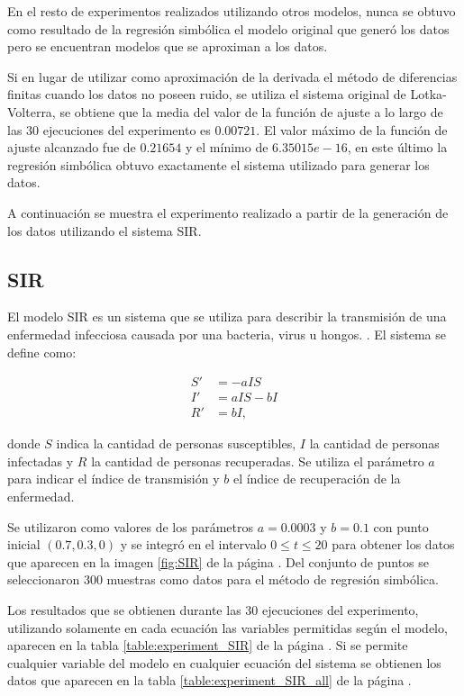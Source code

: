 En el resto de experimentos realizados utilizando otros modelos, nunca se obtuvo como resultado de la regresión simbólica el modelo original que generó los datos pero se encuentran modelos que se aproximan a los datos.

Si en lugar de utilizar como aproximación de la derivada el método de diferencias finitas cuando los datos no poseen ruido, se utiliza el sistema original de Lotka-Volterra, se obtiene que la media del valor de la función de ajuste a lo largo de las 30 ejecuciones del experimento es $0.00721$. El valor máximo de la función de ajuste alcanzado fue de $0.21654$ y el mínimo de $6.35015e-16$, en este último la regresión simbólica obtuvo exactamente el sistema utilizado para generar los datos.


A continuación se muestra el experimento realizado a partir de la generación de los datos utilizando el sistema SIR.

\subsection{SIR}

El modelo SIR es un sistema que se utiliza para describir la transmisión de una enfermedad infecciosa causada por una bacteria, virus u hongos. \cite{weiss2013sir}. El sistema se define como:

\begin{align*}
    S' & = - aIS    \\
    I' & = aIS - bI \\
    R' & = bI,
\end{align*}

donde $S$ indica la cantidad de personas susceptibles, $I$ la cantidad de personas infectadas y $R$ la cantidad de personas recuperadas. Se utiliza el parámetro $a$ para indicar el índice de transmisión y $b$ el índice de recuperación de la enfermedad.

Se utilizaron como valores de los parámetros $a = 0.0003$ y $b = 0.1$ con punto inicial $(0.7, 0.3, 0)$ y se integró en el intervalo $0 \leq t \leq 20$ para obtener los datos que aparecen en la imagen \ref{fig:SIR} de la página \pageref{fig:SIR}. Del conjunto de puntos se seleccionaron 300 muestras como datos para el método de regresión simbólica.

Los resultados que se obtienen durante las 30 ejecuciones del experimento, utilizando solamente en cada ecuación las variables permitidas según el modelo, aparecen en la tabla \ref{table:experiment_SIR} de la página \pageref{table:experiment_SIR}. Si se permite cualquier variable del modelo en cualquier ecuación del sistema se obtienen los datos que aparecen en la tabla \ref{table:experiment_SIR_all} de la página \pageref{table:experiment_SIR_all}.

